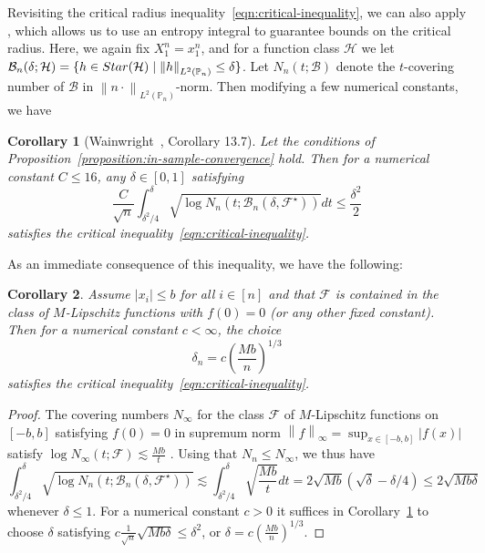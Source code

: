 \documentclass[11pt]{article}
\newcommand{\Prb}{\mathbb{P}}
\newcommand{\mc}[1]{\mathcal{#1}}
\newcommand{\norm}[1]{\left\|{#1}\right\|} %
\newcommand{\linf}[1]{\norm{#1}_\infty} %
\newcommand{\<}{\langle} %
\renewcommand{\>}{\rangle}
\newcommand{\LtwoPn}[1]{\norm{#1}_{L^2(\Prb_n)}}
\newcommand{\starhull}{\textup{Star}}
\newcommand{\opt}{^\star}
\newtheorem{corollary}{Corollary}
\begin{document}
Revisiting the critical radius inequality~\eqref{eqn:critical-inequality},
we can also apply \cite[Corollary~13.7]{Wainwright19}, which allows
us to use an entropy integral to guarantee bounds on the critical
radius. Here, we again fix $X_1^n = x_1^n$, and for a function
class $\mc{H}$ we let
$\mc{B}_n(\delta; \mc{H}) = \{h \in \starhull(\mc{H})
\mid \LtwoPn{h} \le \delta\}$. Let $N_n(t; \mc{B})$ denote the
$t$-covering number of $\mc{B}$ in $\LtwoPn{n\cdot}$-norm. Then
modifying a few numerical constants, we have
\begin{corollary}[Wainwright~\cite{Wainwright19}, Corollary 13.7]
  \label{corollary:localization-via-dudley}
  Let the conditions of
  Proposition~\ref{proposition:in-sample-convergence} hold. Then
  for a numerical constant $C \le 16$,
  any $\delta \in [0, 1]$ satisfying
  \begin{equation*}
    \frac{C}{\sqrt{n}} \int_{\delta^2 / 4}^\delta
    \sqrt{\log N_n(t; \mc{B}_n(\delta, \mc{F}\opt))} dt
    \le \frac{\delta^2}{2}
  \end{equation*}
  satisfies the critical inequality~\eqref{eqn:critical-inequality}.
\end{corollary}
\noindent
As an immediate consequence of this inequality, we have the following:
\begin{corollary}
  \label{corollary:lipschitz-criticality}
  Assume $|x_i| \le b$ for all $i \in [n]$ and that
  $\mc{F}$ is contained in the class of $M$-Lipschitz functions
  with $f(0) = 0$ (or any other fixed constant).
  Then for a numerical
  constant $c < \infty$, the choice
  \begin{equation*}
    \delta_n = c \left(\frac{M b}{n}\right)^{1/3}
  \end{equation*}
  satisfies the critical inequality~\eqref{eqn:critical-inequality}.
\end{corollary}
\begin{proof}
  The covering numbers $N_\infty$
  for the class $\mc{F}$ of $M$-Lipschitz functions
  on $[-b, b]$
  satisfying $f(0) = 0$
  in supremum norm $\linf{f} = \sup_{x \in [-b, b]} |f(x)|$ satisfy
  $\log N_\infty(t; \mc{F}) \lesssim \frac{M b}{t}$
  \cite[cf.][Example 5.10]{Wainwright19}. Using that $N_n \le N_\infty$,
  we thus have
  \begin{equation*}
    \int_{\delta^2/4}^\delta
    \sqrt{\log N_n(t; \mc{B}_n(\delta, \mc{F}\opt))}
    \lesssim
    \int_{\delta^2/4}^\delta
    \sqrt{\frac{Mb}{t}} dt
    = 2 \sqrt{Mb} \left(\sqrt{\delta} - \delta/4\right)
    \le 2 \sqrt{Mb \delta}
  \end{equation*}
  whenever $\delta \le 1$.
  For a numerical constant $c > 0$ it suffices in
  Corollary~\ref{corollary:localization-via-dudley} to choose
  $\delta$ satisfying
  $c \frac{1}{\sqrt{n}} \sqrt{Mb \delta} \le \delta^2$, or
  $\delta = c (\frac{Mb}{n})^{1/3}$.
\end{proof}
\end{document}
